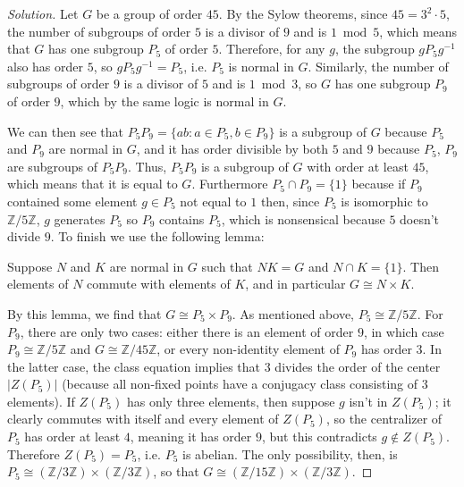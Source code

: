 \documentclass[10pt]{article}
\providecommand{\ZZ}{\mathbb Z}
\providecommand{\inv}{^{-1}}
\newenvironment{soln}{\begin{proof}[Solution]}{\end{proof}}
\providecommand{\abs}[1]{\left|#1\right|}
\begin{document}
\begin{soln}
    Let $G$ be a group of order $45$.
    By the Sylow theorems, since $45 = 3^2\cdot 5$,
    the number of subgroups of order $5$ is a divisor of $9$
    and is $1\bmod 5$, which means that $G$ has one subgroup $P_5$ of order $5$.
    Therefore, for any $g$, the subgroup $gP_5g\inv$ also has order $5$,
    so $gP_5g\inv = P_5$, i.e. $P_5$ is normal in $G$.
    Similarly, the number of subgroups of order $9$ is a divisor of $5$
    and is $1\bmod3$, so $G$ has one subgroup $P_9$ of order $9$,
    which by the same logic is normal in $G$.

    We can then see that $P_5P_9 = \{ab : a\in P_5, b\in P_9\}$
    is a subgroup of $G$ because $P_5$ and $P_9$ are normal in $G$,
    and it has order divisible by both $5$ and $9$ because $P_5$, $P_9$
    are subgroups of $P_5P_9$.
    Thus, $P_5P_9$ is a subgroup of $G$ with order at least $45$,
    which means that it is equal to $G$. Furthermore $P_5\cap P_9 = \{1\}$
    because if $P_9$ contained some element $g\in P_5$ not equal to $1$ then,
    since $P_5$ is isomorphic to $\ZZ/5\ZZ$, $g$ generates $P_5$
    so $P_9$ contains $P_5$, which is nonsensical because $5$ doesn't divide $9$.
    To finish we use the following lemma:

    \begin{lemma}
        Suppose $N$ and $K$ are normal in $G$ such that $NK = G$
	and $N\cap K = \{1\}$. Then elements of $N$ commute with elements of $K$,
	and in particular $G\cong N\times K$.
    \end{lemma}

    By this lemma, we find that $G\cong P_5\times P_9$.
    As mentioned above, $P_5\cong \ZZ/5\ZZ$.
    For $P_9$, there are only two cases: either there is an element of order $9$,
    in which case $P_9 \cong \ZZ/5\ZZ$ and $\boxed{G\cong\ZZ/45\ZZ}$,
    or every non-identity element of $P_9$ has order $3$.
    In the latter case, the class equation implies that $3$
    divides the order of the center $\abs{Z(P_5)}$
    (because all non-fixed points have a conjugacy class consisting of $3$ elements).
    If $Z(P_5)$ has only three elements, then suppose $g$
    isn't in $Z(P_5)$; it clearly commutes with itself and every element of $Z(P_5)$,
    so the centralizer of $P_5$ has order at least $4$, meaning it has order $9$,
    but this contradicts $g\notin Z(P_5)$. Therefore $Z(P_5) = P_5$,
    i.e. $P_5$ is abelian. The only possibility, then, is
    $P_5\cong(\ZZ/3\ZZ)\times(\ZZ/3\ZZ)$, so that
    $\boxed{G\cong(\ZZ/15\ZZ)\times(\ZZ/3\ZZ)}$.
\end{soln}
\end{document}
